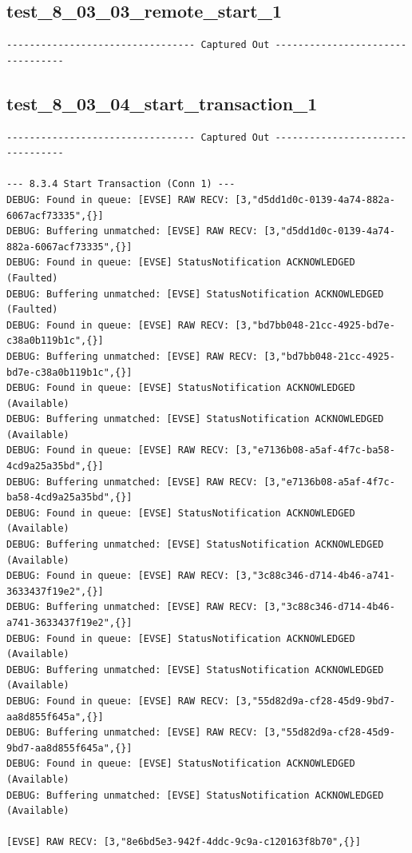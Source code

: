 \documentclass{article}
\begin{document}
\subsection*{test\_8\_03\_03\_remote\_start\_1}
\begin{lstlisting}
--------------------------------- Captured Out ---------------------------------
\end{lstlisting}
\subsection*{test\_8\_03\_04\_start\_transaction\_1}
\begin{lstlisting}
--------------------------------- Captured Out ---------------------------------

--- 8.3.4 Start Transaction (Conn 1) ---
DEBUG: Found in queue: [EVSE] RAW RECV: [3,"d5dd1d0c-0139-4a74-882a-6067acf73335",{}]
DEBUG: Buffering unmatched: [EVSE] RAW RECV: [3,"d5dd1d0c-0139-4a74-882a-6067acf73335",{}]
DEBUG: Found in queue: [EVSE] StatusNotification ACKNOWLEDGED (Faulted)
DEBUG: Buffering unmatched: [EVSE] StatusNotification ACKNOWLEDGED (Faulted)
DEBUG: Found in queue: [EVSE] RAW RECV: [3,"bd7bb048-21cc-4925-bd7e-c38a0b119b1c",{}]
DEBUG: Buffering unmatched: [EVSE] RAW RECV: [3,"bd7bb048-21cc-4925-bd7e-c38a0b119b1c",{}]
DEBUG: Found in queue: [EVSE] StatusNotification ACKNOWLEDGED (Available)
DEBUG: Buffering unmatched: [EVSE] StatusNotification ACKNOWLEDGED (Available)
DEBUG: Found in queue: [EVSE] RAW RECV: [3,"e7136b08-a5af-4f7c-ba58-4cd9a25a35bd",{}]
DEBUG: Buffering unmatched: [EVSE] RAW RECV: [3,"e7136b08-a5af-4f7c-ba58-4cd9a25a35bd",{}]
DEBUG: Found in queue: [EVSE] StatusNotification ACKNOWLEDGED (Available)
DEBUG: Buffering unmatched: [EVSE] StatusNotification ACKNOWLEDGED (Available)
DEBUG: Found in queue: [EVSE] RAW RECV: [3,"3c88c346-d714-4b46-a741-3633437f19e2",{}]
DEBUG: Buffering unmatched: [EVSE] RAW RECV: [3,"3c88c346-d714-4b46-a741-3633437f19e2",{}]
DEBUG: Found in queue: [EVSE] StatusNotification ACKNOWLEDGED (Available)
DEBUG: Buffering unmatched: [EVSE] StatusNotification ACKNOWLEDGED (Available)
DEBUG: Found in queue: [EVSE] RAW RECV: [3,"55d82d9a-cf28-45d9-9bd7-aa8d855f645a",{}]
DEBUG: Buffering unmatched: [EVSE] RAW RECV: [3,"55d82d9a-cf28-45d9-9bd7-aa8d855f645a",{}]
DEBUG: Found in queue: [EVSE] StatusNotification ACKNOWLEDGED (Available)
DEBUG: Buffering unmatched: [EVSE] StatusNotification ACKNOWLEDGED (Available)

[EVSE] RAW RECV: [3,"8e6bd5e3-942f-4ddc-9c9a-c120163f8b70",{}]


\end{lstlisting}
\end{document}
